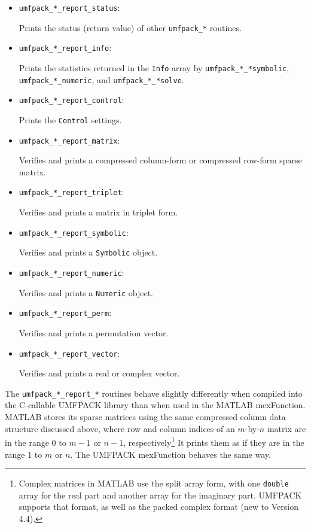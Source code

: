 \documentclass[11pt]{article}
\begin{document}
\begin{itemize}
\item {\tt umfpack\_*\_report\_status}:

    Prints the status (return value) of other {\tt umfpack\_*} routines.

\item {\tt umfpack\_*\_report\_info}:

    Prints the statistics returned in the {\tt Info} array by
    {\tt umfpack\_*\_*symbolic},
    {\tt umfpack\_*\_numeric}, and {\tt umfpack\_*\_*solve}.

\item {\tt umfpack\_*\_report\_control}:

    Prints the {\tt Control} settings.

\item {\tt umfpack\_*\_report\_matrix}:

    Verifies and prints a compressed column-form or compressed row-form sparse
    matrix.

\item {\tt umfpack\_*\_report\_triplet}:

    Verifies and prints a matrix in triplet form.

\item {\tt umfpack\_*\_report\_symbolic}:

    Verifies and prints a {\tt Symbolic} object.

\item {\tt umfpack\_*\_report\_numeric}:

    Verifies and prints a {\tt Numeric} object.

\item {\tt umfpack\_*\_report\_perm}:

    Verifies and prints a permutation vector.

\item {\tt umfpack\_*\_report\_vector}:

    Verifies and prints a real or complex vector.

\end{itemize}

The {\tt umfpack\_*\_report\_*} routines behave slightly differently when
compiled
into the C-callable UMFPACK library than when used in the MATLAB mexFunction.
MATLAB stores its sparse matrices using the same compressed column data
structure discussed above, where row and column indices of an $m$-by-$n$
matrix are in the range 0 to $m-1$ or $n-1$, respectively\footnote{Complex
matrices in MATLAB use the split array form, with one {\tt double} array
for the real part and another array for the imaginary part.  UMFPACK
supports that format, as well as the packed complex format (new to Version 4.4).}
It prints them as if they are in the range 1 to $m$ or $n$.
The UMFPACK mexFunction behaves the same way.
\end{document}

